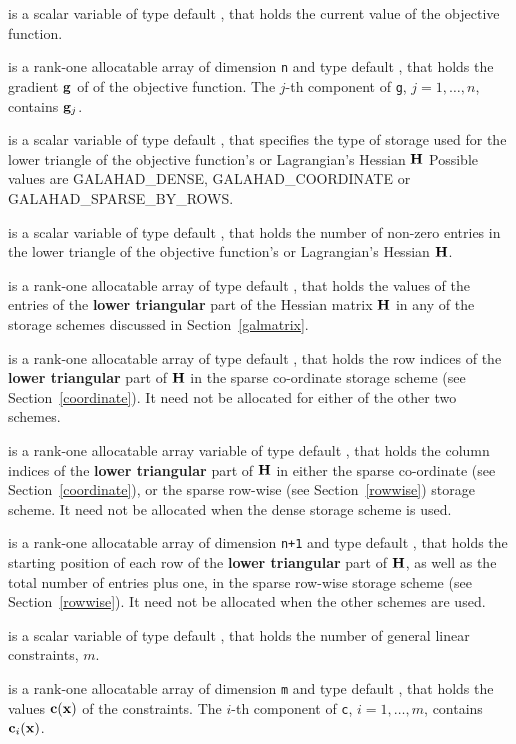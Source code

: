 \documentclass{galahad}
\newcommand{\sym}{\sf\small}
\begin{document}
\begin{description}
 is a scalar variable of type default \realdp,
that holds the current value of the objective function.

 is a rank-one allocatable array of dimension {\tt n} and type 
default \realdp, that holds the gradient ${\mathbf{g}}$ 
of of the objective function.
The $j$-th component of 
{\tt g}, $j = 1,  \ldots ,  n$, contains ${\mathbf{g}}_{j}$.

 is a scalar variable of type default \integer, 
that specifies the type of storage used for the lower triangle of the 
objective function's or Lagrangian's Hessian ${\mathbf{H}}$
Possible values are {\sym GALAHAD\_DENSE}, {\sym GALAHAD\_COORDINATE} 
or {\sym GALAHAD\_SPARSE\_BY\_ROWS}.

 is a scalar variable of type default \integer, 
that holds the number of non-zero entries in the lower triangle of the
objective function's or Lagrangian's Hessian ${\mathbf{H}}$.

 is a rank-one allocatable array of type default \realdp, that holds
the values of the entries of the {\bf lower triangular} part
of the Hessian matrix ${\mathbf{H}}$ in any of the 
storage schemes discussed in Section~\ref{galmatrix}.

 is a rank-one allocatable array of type default \integer,
that holds the row indices of the {\bf lower triangular} part of ${\mathbf{H}}$ 
in the sparse co-ordinate storage
scheme (see Section~\ref{coordinate}). 
It need not be allocated for either of the other two schemes.

 is a rank-one allocatable array variable of type default \integer,
that holds the column indices of the {\bf lower triangular} part of 
${\mathbf{H}}$ in either the sparse co-ordinate 
(see Section~\ref{coordinate}), or the sparse row-wise 
(see Section~\ref{rowwise}) storage scheme.
It need not be allocated when the dense storage scheme is used.

 is a rank-one allocatable array of dimension {\tt n+1} and type 
default \integer, that holds the starting position of 
each row of the {\bf lower triangular} part of ${\mathbf{H}}$, as well
as the total number of entries plus one, in the sparse row-wise storage
scheme (see Section~\ref{rowwise}). It need not be allocated when the
other schemes are used.

 is a scalar variable of type default \integer, 
 that holds the number of general linear constraints, $m$.

 is a rank-one allocatable array of dimension {\tt m} and type default 
\realdp, that holds
the values ${\mathbf{c}}({\mathbf{x}} )$ of the constraints.
The $i$-th component of {\tt c}, $i = 1,  \ldots ,  m$, contains 
${\mathbf{c}}_{i}({\mathbf{x}})$.  


\end{description}
\end{document}
